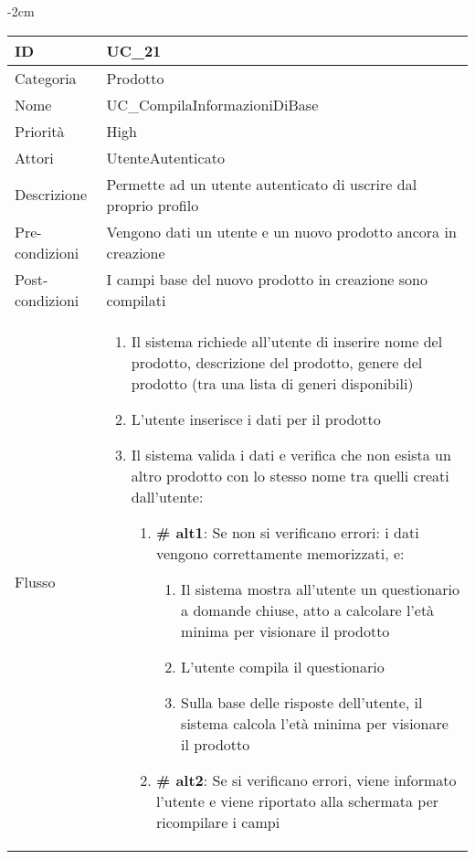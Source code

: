 \begin{center}
\begin{table}[bp]
    \centering
    \addtolength{\leftskip} {-2cm}
\begin{tabular}{ |p{2.6cm}|p{13cm}|  }
\hline
ID & UC\_21\\\hline
Categoria & Prodotto \\\hline
Nome & UC\_CompilaInformazioniDiBase \\\hline
Priorità & High \\\hline
Attori &  UtenteAutenticato \\\hline
Descrizione & Permette ad un utente autenticato di uscrire dal proprio profilo \\\hline
Pre-condizioni &  Vengono dati un utente e un nuovo prodotto ancora in creazione\\\hline
Post-condizioni &  I campi base del nuovo prodotto in creazione sono compilati\\\hline
Flusso &  	\vspace{-5mm} \begin{enumerate}
			\item Il sistema richiede all'utente di inserire nome del prodotto, descrizione del prodotto, genere del prodotto (tra una lista di generi disponibili)
			\item L'utente inserisce i dati per il prodotto
			\item Il sistema valida i dati e verifica che non esista un altro prodotto con lo stesso nome tra quelli creati dall'utente:
			\begin{enumerate}[  ]
				\item \textbf{\# alt1}: Se non si verificano errori: i dati vengono correttamente memorizzati, e:
				\begin{enumerate}[label*=\arabic*.]
					\item Il sistema mostra all'utente un questionario a domande chiuse, atto a calcolare l'età minima per visionare il prodotto
					\item L'utente compila il questionario
					\item Sulla base delle risposte dell'utente, il sistema calcola l'età minima per visionare il prodotto
				\end{enumerate}
				\item \textbf{\# alt2}: Se si verificano errori, viene informato l'utente e viene riportato alla schermata per ricompilare i campi
			\end{enumerate}
		\end{enumerate}\\\hline
\end{tabular}
\label{table_use_case:21}\newline
\end{table}


\end{center}
